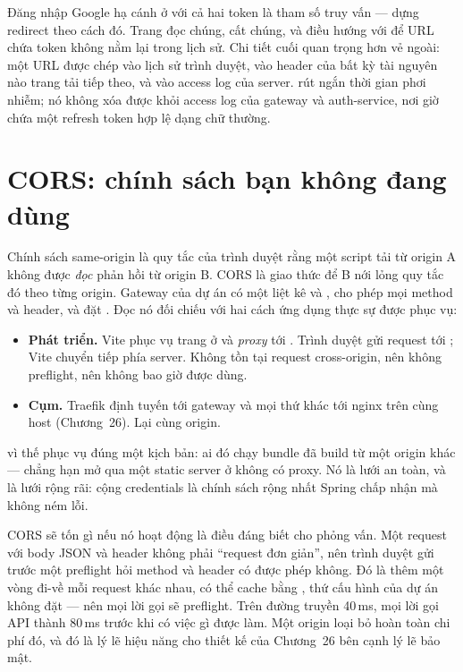 Đăng nhập Google hạ cánh ở  với cả hai token
là tham số truy vấn ---  dựng redirect
theo cách đó. Trang đọc chúng, cất chúng, và điều hướng với
 để URL chứa token không nằm lại trong lịch sử.
Chi tiết cuối quan trọng hơn vẻ ngoài: một URL được chép vào lịch sử
trình duyệt, vào header  của bất kỳ tài nguyên nào trang
tải tiếp theo, và vào access log của server.  rút ngắn
thời gian phơi nhiễm; nó không xóa được khỏi access log của gateway
và auth-service, nơi giờ chứa một refresh token hợp lệ dạng chữ
thường.

\section{CORS: chính sách bạn không đang dùng}

Chính sách same-origin là quy tắc của trình duyệt rằng một script tải
từ origin A không được \emph{đọc} phản hồi từ origin B. CORS là giao
thức để B nới lỏng quy tắc đó theo từng origin. Gateway của dự án có
một  liệt kê  và
, cho phép mọi method và header, và đặt
. Đọc nó đối chiếu với hai cách ứng dụng
thực sự được phục vụ:

\begin{itemize}
  \item \textbf{Phát triển.} Vite phục vụ trang ở  và
  \emph{proxy}  tới . Trình duyệt gửi request
  tới ; Vite chuyển tiếp phía server. Không tồn tại request
  cross-origin, nên không preflight, nên  không bao
  giờ được dùng.
  \item \textbf{Cụm.} Traefik định tuyến  tới gateway và
  mọi thứ khác tới nginx trên cùng host (Chương~26). Lại cùng origin.
\end{itemize}

 vì thế phục vụ đúng một kịch bản: ai đó chạy bundle
đã build từ một origin khác --- chẳng hạn mở 
qua một static server ở  không có proxy. Nó là lưới an
toàn, và là lưới rộng rãi:  cộng
credentials là chính sách rộng nhất Spring chấp nhận mà không ném lỗi.

CORS sẽ tốn gì nếu nó hoạt động là điều đáng biết cho phỏng vấn. Một
request với body JSON và header  không phải
``request đơn giản'', nên trình duyệt gửi trước một preflight
 hỏi method và header có được phép không. Đó là thêm một
vòng đi-về mỗi request khác nhau, có thể cache bằng
, thứ cấu hình của dự án không đặt --- nên
mọi lời gọi sẽ preflight. Trên đường truyền 40\,ms, mọi lời gọi API
thành 80\,ms trước khi có việc gì được làm. Một origin loại bỏ hoàn
toàn chi phí đó, và đó là lý lẽ hiệu năng cho thiết kế của Chương~26
bên cạnh lý lẽ bảo mật.

